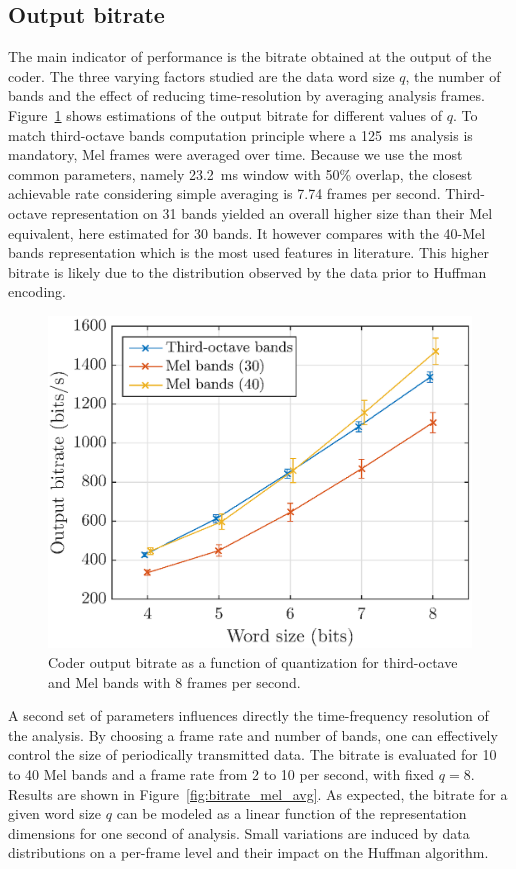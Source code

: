 \documentclass[12pt,times,onecolumn]{article}
\begin{document}
\subsection{Output bitrate}
The main indicator of performance is the bitrate obtained at the output of the coder. The three varying factors studied are the data word size $q$, the number of bands and the effect of reducing time-resolution by averaging analysis frames. Figure~\ref{fig:bitrate_q} shows estimations of the output bitrate for different values of $q$. To match third-octave bands computation principle where a 125~ms analysis is mandatory, Mel frames were averaged over time. Because we use the most common parameters, namely 23.2~ms window with 50\% overlap, the closest achievable rate considering simple averaging is 7.74 frames per second. Third-octave representation on 31 bands yielded an overall higher size than their Mel equivalent, here estimated for 30 bands. It however compares with the 40-Mel bands representation which is the most used features in literature. This higher bitrate is likely due to the distribution observed by the data prior to Huffman encoding.\\

\begin{figure}[htbp]
	\centering
		\includegraphics[width=0.7\columnwidth]{figures/bitrate_qall.eps}
	\caption{Coder output bitrate as a function of quantization for third-octave and Mel bands with 8 frames per second.}
	\label{fig:bitrate_q}
\end{figure}

A second set of parameters influences directly the time-frequency resolution of the analysis. By choosing a frame rate and number of bands, one can effectively control the size of periodically transmitted data. The bitrate is evaluated for 10 to 40 Mel bands and a frame rate from 2 to 10 per second, with fixed $q = 8$. Results are shown in Figure~\ref{fig:bitrate_mel_avg}. As expected, the bitrate for a given word size $q$ can be modeled as a linear function of the representation dimensions for one second of analysis. Small variations are induced by data distributions on a per-frame level and their impact on the Huffman algorithm.\\
\end{document}
